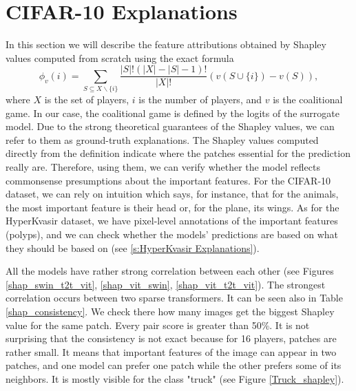 \documentclass[magisterska,en]{pracamgr}
\begin{document}
\section{CIFAR-10 Explanations}
In this section we will describe the feature attributions obtained by Shapley values computed from scratch using the exact formula
  \begin{equation*}
      \phi_v(i) = \sum_{S\subseteq X\backslash \{i\}} \frac{|S|!(|X|-|S|-1)!}{|X|!}\left(v(S \cup \{i\}) - v(S)\right),
  \end{equation*}
where $X$ is the set of players, $i$ is the number of players, and $v$ is the coalitional game. In our case, the coalitional game is defined by the logits of the surrogate model. Due to the strong theoretical guarantees of the Shapley values, we can refer to them as ground-truth explanations. The Shapley values computed directly from the definition indicate where the patches essential for the prediction really are. Therefore, using them, we can verify whether the model reflects commonsense presumptions about the important features. For the CIFAR-10 dataset, we can rely on intuition which says, for instance, that for the animals, the most important feature is their head or, for the plane, its wings. As for the HyperKvasir dataset, we have pixel-level annotations of the important features (polyps), and we can check whether the models' predictions are based on what they should be based on (see \ref{s:HyperKvasir Explanations}).





All the models have rather strong correlation between each other (see Figures \ref{shap_swin_t2t_vit}, \ref{shap_vit_swin}, \ref{shap_vit_t2t_vit}). The strongest correlation occurs between two sparse transformers. It can be seen also in Table \ref{shap_consistency}. We check there how many images get the biggest Shapley value for the same patch. Every pair score is greater than 50\%. It is not surprising that the consistency is not exact because for 16 players, patches are rather small. It means that important features of the image can appear in two patches, and one model can prefer one patch while the other prefers some of its neighbors. It is mostly visible for the class "truck" (see Figure \ref{Truck_shapley}).
\end{document}

